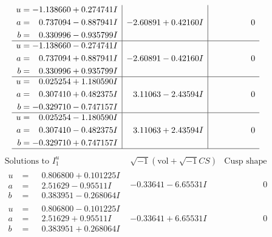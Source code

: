 \documentclass[1p]{elsarticle_modified}
\theoremstyle{definition}
\newcommand{\I}{\sqrt{-1}}
\begin{document}
$$\begin{array}{c|c|c}
\begin{aligned}
u &= -1.138660 + 0.274741 I \\
a &= \phantom{-}0.737094 - 0.887941 I \\
b &= \phantom{-}0.330996 - 0.935799 I\end{aligned}
 & -2.60891 + 0.42160 I & \phantom{-0.000000 } 0 \\ \hline\begin{aligned}
u &= -1.138660 - 0.274741 I \\
a &= \phantom{-}0.737094 + 0.887941 I \\
b &= \phantom{-}0.330996 + 0.935799 I\end{aligned}
 & -2.60891 - 0.42160 I & \phantom{-0.000000 } 0 \\ \hline\begin{aligned}
u &= \phantom{-}0.025254 + 1.180590 I \\
a &= \phantom{-}0.307410 + 0.482375 I \\
b &= -0.329710 - 0.747157 I\end{aligned}
 & \phantom{-}3.11063 - 2.43594 I & \phantom{-0.000000 } 0 \\ \hline\begin{aligned}
u &= \phantom{-}0.025254 - 1.180590 I \\
a &= \phantom{-}0.307410 - 0.482375 I \\
b &= -0.329710 + 0.747157 I\end{aligned}
 & \phantom{-}3.11063 + 2.43594 I & \phantom{-0.000000 } 0\\
 \hline 
 \end{array}$$\newpage$$\begin{array}{c|c|c}  
\text{Solutions to }I^u_{1}& \I (\text{vol} + \sqrt{-1}CS) & \text{Cusp shape}\\
 \hline 
\begin{aligned}
u &= \phantom{-}0.806800 + 0.101225 I \\
a &= \phantom{-}2.51629 - 0.95511 I \\
b &= \phantom{-}0.383951 - 0.268064 I\end{aligned}
 & -0.33641 - 6.65531 I & \phantom{-0.000000 } 0 \\ \hline\begin{aligned}
u &= \phantom{-}0.806800 - 0.101225 I \\
a &= \phantom{-}2.51629 + 0.95511 I \\
b &= \phantom{-}0.383951 + 0.268064 I\end{aligned}
 & -0.33641 + 6.65531 I & \phantom{-0.000000 } 0 \\ \hline\begin{aligned}

\end{aligned}
\end{array}$$
\end{document}
